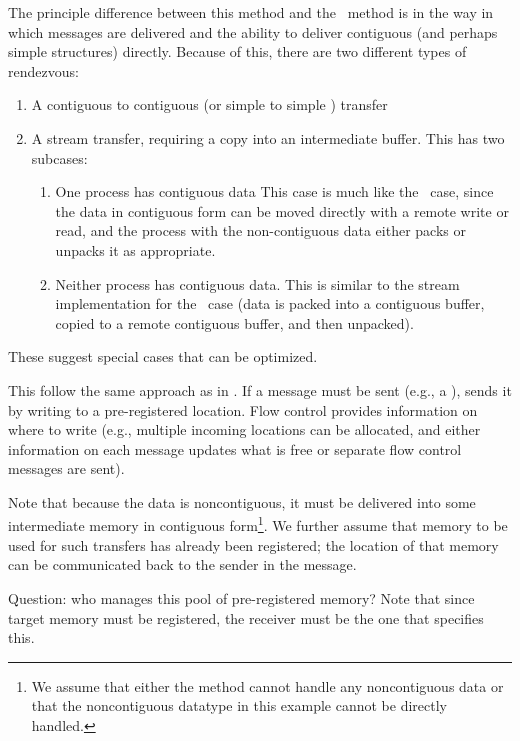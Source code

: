 The principle difference between this method and the \tcpname\ method is in
the way in which messages are delivered and the ability to deliver contiguous
(and perhaps simple  structures) directly.  Because of this, there
are two different types of rendezvous:
\begin{enumerate}
\item A contiguous to contiguous (or simple  to simple
  ) transfer 
\item A stream transfer, requiring a copy into an intermediate buffer.
  This has two subcases:
  \begin{enumerate}
  \item One process has contiguous data
  This case is much like the \shmemname\ case, since the data in contiguous
  form can be moved directly with a remote write or read, and the process with
  the non-contiguous data either packs or unpacks it as appropriate.
  \item Neither process has contiguous data.  This is similar to the
  stream implementation for the \tcpname\ case (data is packed into a
  contiguous buffer, copied to a remote contiguous buffer, and then unpacked).
  \end{enumerate}
\end{enumerate}
These suggest special cases that can be optimized.


This follow the same approach as in \tcpname.  
If a message must be sent (e.g., a
),  sends it by writing to
a pre-registered location.  Flow control provides information on where to
write (e.g., multiple incoming locations can be allocated, and either
information on each message updates what is free or separate flow control
messages are sent).   

Note that because the data is noncontiguous, it must be delivered into some
intermediate memory in contiguous form\footnote{We assume that either the
  method cannot handle any noncontiguous data or that the noncontiguous
  datatype in this example cannot be directly handled.}.  We further assume
that memory to be used for such transfers has already been registered; the
location of that memory can be communicated back to the sender in the
 message.  

Question: who manages this pool of pre-registered memory?  Note that since
target memory must be registered, the receiver must be the one that specifies
this.  

